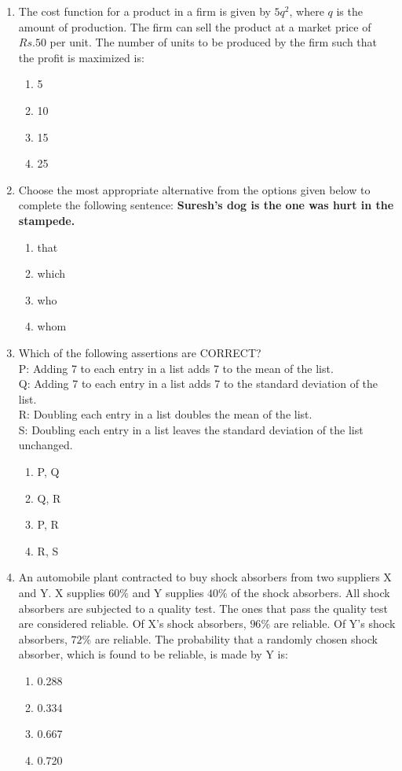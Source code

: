 \documentclass[journal]{IEEEtran}
\numberwithin{equation}{enumi}
\numberwithin{figure}{enumi}
\begin{document}
\begin{enumerate}[start=53]
\item The cost function for a product in a firm is given by $5q^2$, where $q$ is the amount of production. The firm can sell the product at a market price of $Rs. 50$ per unit. The number of units to be produced by the firm such that the profit is maximized is:
    \begin{enumerate}
        \item 5
        \item 10
        \item 15
        \item 25
    \end{enumerate}

\item Choose the most appropriate alternative from the options given below to complete the following sentence:  
	\textbf{Suresh's dog is the one \underline{\hspace{1cm}} was hurt in the stampede.}
    \begin{enumerate}
        \item that
        \item which
        \item who
        \item whom
    \end{enumerate}

\item Which of the following assertions are CORRECT?\\
        P: Adding 7 to each entry in a list adds 7 to the mean of the list.\\
        Q: Adding 7 to each entry in a list adds 7 to the standard deviation of the list.\\
        R: Doubling each entry in a list doubles the mean of the list.\\
        S: Doubling each entry in a list leaves the standard deviation of the list unchanged.
    \begin{enumerate}
        \item P, Q
        \item Q, R
        \item P, R
        \item R, S
    \end{enumerate}

\item An automobile plant contracted to buy shock absorbers from two suppliers X and Y. X supplies $60\%$ and Y supplies $40\%$ of the shock absorbers. All shock absorbers are subjected to a quality test. The ones that pass the quality test are considered reliable. Of X's shock absorbers, $96\%$ are reliable. Of Y's shock absorbers, $72\%$ are reliable.  
The probability that a randomly chosen shock absorber, which is found to be reliable, is made by Y is:
    \begin{enumerate}
        \item 0.288
        \item 0.334
        \item 0.667
        \item 0.720
    \end{enumerate}


\end{enumerate}
\end{document}
